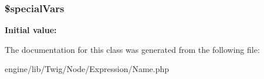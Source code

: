 \subsubsection[{\$special\+Vars}]{\setlength{\rightskip}{0pt plus 5cm}\$special\+Vars\hspace{0.3cm}{\ttfamily [protected]}}\label{class_twig___node___expression___name_a501eec646ef05064ff71a3d11874906b}
{\bfseries Initial value\+:}


The documentation for this class was generated from the following file\+:\begin{DoxyCompactItemize}
\item 
engine/lib/\+Twig/\+Node/\+Expression/Name.\+php\end{DoxyCompactItemize}
